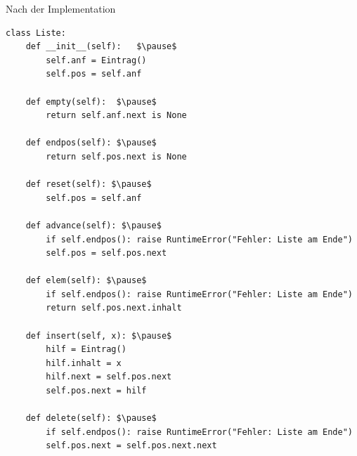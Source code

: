 \documentclass{beamer}
\begin{document}
\begin{frame}[fragile]
Nach der Implementation 
\footnotesize 
\begin{lstlisting} 
class Liste:
    def __init__(self):   $\pause$
        self.anf = Eintrag()
        self.pos = self.anf
       
    def empty(self):  $\pause$
        return self.anf.next is None
    
    def endpos(self): $\pause$
        return self.pos.next is None

    def reset(self): $\pause$
        self.pos = self.anf

    def advance(self): $\pause$
        if self.endpos(): raise RuntimeError("Fehler: Liste am Ende")
        self.pos = self.pos.next

    def elem(self): $\pause$
        if self.endpos(): raise RuntimeError("Fehler: Liste am Ende")
        return self.pos.next.inhalt

    def insert(self, x): $\pause$
        hilf = Eintrag()
        hilf.inhalt = x
        hilf.next = self.pos.next
        self.pos.next = hilf

    def delete(self): $\pause$
        if self.endpos(): raise RuntimeError("Fehler: Liste am Ende")
        self.pos.next = self.pos.next.next
\end{lstlisting} 
\end{frame}




 
\end{document}
